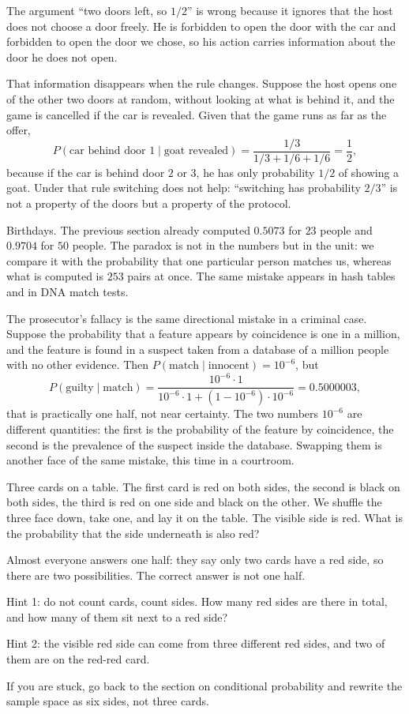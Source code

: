The argument ``two doors left, so $1/2$'' is wrong because it ignores that the host does not
choose a door freely. He is forbidden to open the door with the car and forbidden to open
the door we chose, so his action carries information about the door he does not open.

That information disappears when the rule changes. Suppose the host opens one of the other
two doors at random, without looking at what is behind it, and the game is cancelled if the
car is revealed. Given that the game runs as far as the offer,
\[
P(\text{car behind door }1\mid \text{goat revealed})
=\frac{1/3}{1/3+1/6+1/6}=\frac{1}{2},
\]
because if the car is behind door $2$ or $3$, he has only probability $1/2$ of showing a
goat. Under that rule switching does not help: ``switching has probability $2/3$'' is not a
property of the doors but a property of the protocol.


Birthdays. The previous section already computed $0.5073$ for $23$ people and $0.9704$ for
$50$ people. The paradox is not in the numbers but in the unit: we compare it with the
probability that one particular person matches us, whereas what is computed is $253$
pairs at once. The same mistake appears in hash tables and in DNA match tests.

The prosecutor's fallacy is the same directional mistake in a criminal case. Suppose the
probability that a feature appears by coincidence is one in a million, and the feature is
found in a suspect taken from a database of a million people with no other evidence. Then
$P(\text{match}\mid\text{innocent})=10^{-6}$, but
\[
P(\text{guilty}\mid\text{match})
=\frac{10^{-6}\cdot 1}{10^{-6}\cdot 1+(1-10^{-6})\cdot 10^{-6}}=0.5000003,
\]
that is practically one half, not near certainty. The two numbers $10^{-6}$ are different
quantities: the first is the probability of the feature by coincidence, the second is the
prevalence of the suspect inside the database. Swapping them is another face of the same
mistake, this time in a courtroom.

\begin{tantangan}
Three cards on a table. The first card is red on both sides, the second is black on both
sides, the third is red on one side and black on the other. We shuffle the three face down,
take one, and lay it on the table. The visible side is red. What is the probability that
the side underneath is also red?

Almost everyone answers one half: they say only two cards have a red side, so there are two
possibilities. The correct answer is not one half.

Hint 1: do not count cards, count sides. How many red sides are there in total, and how many
of them sit next to a red side?

Hint 2: the visible red side can come from three different red sides, and two of them are on
the red-red card.

If you are stuck, go back to the section on conditional probability and rewrite the sample
space as six sides, not three cards.
\end{tantangan}

